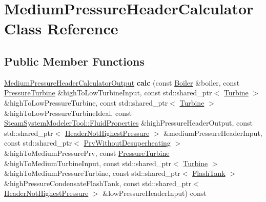 \hypertarget{class_medium_pressure_header_calculator}{}\section{Medium\+Pressure\+Header\+Calculator Class Reference}
\label{class_medium_pressure_header_calculator}
\subsection*{Public Member Functions}
\begin{DoxyCompactItemize}
\item 
\mbox{\label{class_medium_pressure_header_calculator_aafac27b1848d997cfd25790e40ad0f29}} 
\hyperlink{class_medium_pressure_header_calculator_output}{Medium\+Pressure\+Header\+Calculator\+Output} {\bfseries calc} (const \hyperlink{class_boiler}{Boiler} \&boiler, const \hyperlink{class_pressure_turbine}{Pressure\+Turbine} \&high\+To\+Low\+Turbine\+Input, const std\+::shared\+\_\+ptr$<$ \hyperlink{class_turbine}{Turbine} $>$ \&high\+To\+Low\+Pressure\+Turbine, const std\+::shared\+\_\+ptr$<$ \hyperlink{class_turbine}{Turbine} $>$ \&high\+To\+Low\+Pressure\+Turbine\+Ideal, const \hyperlink{struct_steam_system_modeler_tool_1_1_fluid_properties}{Steam\+System\+Modeler\+Tool\+::\+Fluid\+Properties} \&high\+Pressure\+Header\+Output, const std\+::shared\+\_\+ptr$<$ \hyperlink{class_header_not_highest_pressure}{Header\+Not\+Highest\+Pressure} $>$ \&medium\+Pressure\+Header\+Input, const std\+::shared\+\_\+ptr$<$ \hyperlink{class_prv_without_desuperheating}{Prv\+Without\+Desuperheating} $>$ \&high\+To\+Medium\+Pressure\+Prv, const \hyperlink{class_pressure_turbine}{Pressure\+Turbine} \&high\+To\+Medium\+Turbine\+Input, const std\+::shared\+\_\+ptr$<$ \hyperlink{class_turbine}{Turbine} $>$ \&high\+To\+Medium\+Pressure\+Turbine, const std\+::shared\+\_\+ptr$<$ \hyperlink{class_flash_tank}{Flash\+Tank} $>$ \&high\+Pressure\+Condensate\+Flash\+Tank, const std\+::shared\+\_\+ptr$<$ \hyperlink{class_header_not_highest_pressure}{Header\+Not\+Highest\+Pressure} $>$ \&low\+Pressure\+Header\+Input) const
\item 
\mbox{\label{class_medium_pressure_header_calculator_aafac27b1848d997cfd25790e40ad0f29}} 

\end{DoxyCompactItemize}
